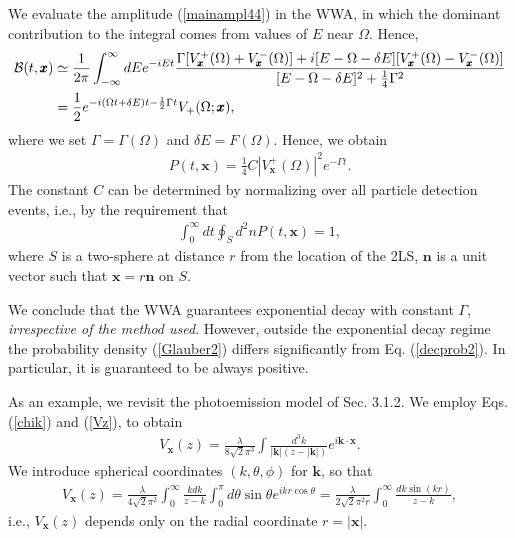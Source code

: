 \documentclass[12pt]{article}
\numberwithin{equation}{section}
\begin{document}
We evaluate the amplitude (\ref{mainampl44})  in the WWA, in which the dominant contribution to the integral comes
 from values of $E$ near $\Omega$. Hence,
\begin{align}
{\cal B}(t,  {\pmb x}) &\simeq
  \frac{1}{2 \pi }  \int_{-\infty }^{\infty } dE e^{-iEt}  \frac{ \Gamma  [V_{\pmb x}^+(\Omega) +V_{\pmb x}^-(\Omega) ]  + i [E - \Omega - \delta E][V_{\pmb x}^+(\Omega)  - V_{\pmb x}^-(\Omega) ]   }{ [E - \Omega - \delta E]^2 + \frac{1}{4}\Gamma^2} \nonumber \\
&= \frac{1}{2} e^{-i (\Omega t + \delta E)t - \frac{1}{2}\Gamma t}   V_+(\Omega; {\pmb x})   , \label{mainampl44b}
\end{align}
where we set $\Gamma = \Gamma(\Omega)$ and $\delta E = F(\Omega)$. Hence, we obtain
\begin{eqnarray}
P(t, {\pmb x})  = \frac{1}{4} C|V_{\pmb x}^+(\Omega) |^2 e^{-\Gamma t}. \label{decayGl}
\end{eqnarray}
The constant $C$ can be determined by normalizing over all particle detection events, i.e., by the requirement that
\begin{eqnarray}
\int_0^{\infty} dt \oint_{S} d^2n  P(t, {\pmb x}) =1  , \label{normalk}
\end{eqnarray}
where $S$ is a two-sphere at distance $r$ from the location of the 2LS, ${\pmb n}$ is a unit vector such that ${\pmb x} = r {\pmb n}$ on $S$.

We conclude  that the WWA guarantees exponential decay with constant $\Gamma$, {\em irrespective of the method used}. However, outside the exponential decay regime the probability density (\ref{Glauber2}) differs significantly from Eq. (\ref{decprob2}). In particular, it is guaranteed to be always positive.



\medskip

As an example, we revisit the photoemission model of Sec. 3.1.2. We employ Eqs. (\ref{chik}) and (\ref{Vz}), to obtain
\begin{eqnarray}
V_{\pmb x}(z) = \frac{\lambda}{8\sqrt{2} \pi^3} \int \frac{d^3k}{|{\pmb k}|(z - |{\pmb k}|)} e^{i {\pmb k} \cdot {\pmb x}}.
\end{eqnarray}
We introduce spherical coordinates $(k, \theta, \phi)$ for ${\pmb k}$, so that
\begin{eqnarray}
V_{\pmb x}(z) = \frac{\lambda}{4\sqrt{2} \pi^2} \int_0^{\infty} \frac{kdk}{z- k} \int_0^{\pi} d\theta \sin \theta e^{ikr \cos \theta} =
 \frac{\lambda}{2\sqrt{2} \pi^2 r} \int_0^{\infty} \frac{dk \sin(kr)}{z-k}, \label{vzr}
\end{eqnarray}
i.e., $V_{\pmb x}(z)$ depends only on the radial coordinate $r = |{\pmb x}|$.
\end{document}
